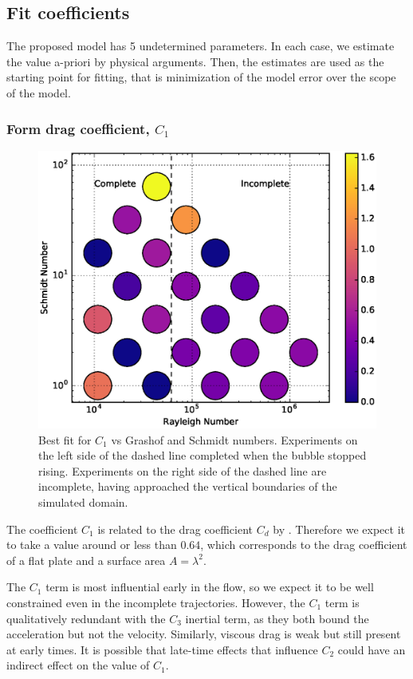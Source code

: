 \subsection{Fit coefficients}
The proposed model has 5 undetermined parameters.
In each case, we estimate the value a-priori by physical arguments.
Then, the estimates are used as the starting point for fitting, that is minimization of the model error over the scope of the model.

\subsubsection{Form drag coefficient, $C_1$}

\begin{figure}
\includegraphics[width=\columnwidth]{figs/C1-vs-Rayleigh-Schmidt}
\caption{ 
  Best fit for $C_1$ vs Grashof and Schmidt numbers.
  Experiments on the left side of the dashed line completed when the bubble stopped rising.
  Experiments on the right side of the dashed line are incomplete, having approached the vertical boundaries of the simulated domain.
}
\end{figure}

The coefficient $C_1$ is related to the drag coefficient $C_d$ by .
Therefore we expect it to take a value around or less than $0.64$, which corresponds to the drag coefficient of a flat plate and a surface area $A = \lambda^2$.

The $C_1$ term is most influential early in the flow, so we expect it to be well constrained even in the incomplete trajectories.
However, the $C_1$ term is qualitatively redundant with the $C_3$ inertial term, as they both bound the acceleration but not the velocity.
Similarly, viscous drag is weak but still present at early times.
It is possible that late-time effects that influence $C_2$ could have an indirect effect on the value of $C_1$.

